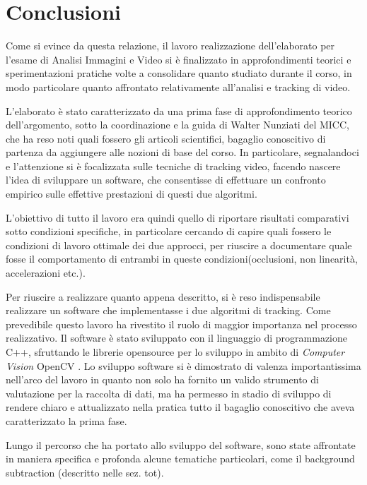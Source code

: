 ﻿\section{Conclusioni}

Come si evince da questa relazione, il lavoro realizzazione dell'elaborato per l'esame di Analisi Immagini e Video si è finalizzato in approfondimenti teorici e sperimentazioni pratiche volte a consolidare quanto studiato durante il corso, in modo particolare quanto affrontato relativamente all'analisi e tracking di video. 

L'elaborato è stato caratterizzato da una prima fase di approfondimento teorico dell'argomento, sotto la coordinazione e la guida di Walter Nunziati del MICC, che ha reso noti quali fossero gli articoli scientifici, bagaglio conoscitivo di partenza da aggiungere alle nozioni di base del corso. In particolare, segnalandoci \cite{kalman-intro} e \cite{condensation} l'attenzione si è focalizzata sulle tecniche di tracking video, facendo nascere l'idea di sviluppare un software, che consentisse di effettuare un confronto empirico sulle effettive prestazioni di questi due algoritmi.

L'obiettivo di tutto il lavoro era quindi quello di riportare risultati comparativi sotto condizioni specifiche, in particolare cercando di capire quali fossero le condizioni di lavoro ottimale dei due approcci, per riuscire a documentare quale fosse il comportamento di entrambi in queste condizioni(occlusioni, non linearità, accelerazioni etc.).

Per riuscire a realizzare quanto appena descritto, si è reso indispensabile realizzare un software che implementasse i due algoritmi di tracking. Come prevedibile questo lavoro ha rivestito il ruolo di maggior importanza nel processo realizzativo. Il software è stato sviluppato con il linguaggio di programmazione C++, sfruttando le librerie opensource per lo sviluppo in ambito di \emph{Computer Vision} OpenCV \cite{opencv}. Lo sviluppo software si è dimostrato di valenza importantissima nell'arco del lavoro in quanto non solo ha fornito un valido strumento di valutazione per la raccolta di dati, ma ha permesso in stadio di sviluppo di rendere chiaro e attualizzato nella pratica tutto il bagaglio conoscitivo che aveva caratterizzato la prima fase.

Lungo il percorso che ha portato allo sviluppo del software, sono state affrontate in maniera specifica e profonda alcune tematiche particolari, come il background subtraction (descritto nelle sez. tot).

